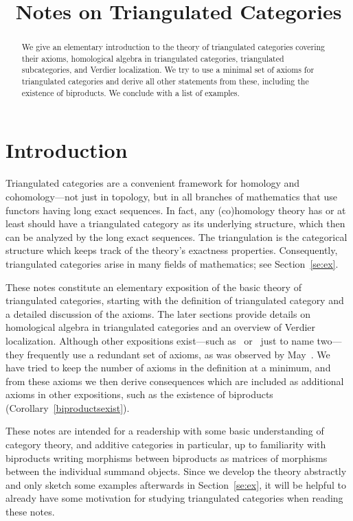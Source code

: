\documentclass{amsproc}
\title{Notes on Triangulated Categories}
\theoremstyle{definition}
\begin{document}
\maketitle
\begin{abstract}
We give an elementary introduction to the theory of triangulated categories covering their axioms, homological algebra in triangulated categories, triangulated subcategories, and Verdier localization. We try to use a minimal set of axioms for triangulated categories and derive all other statements from these, including the existence of biproducts. We conclude with a list of examples.
\end{abstract}
\tableofcontents

\section{Introduction}
\label{examples}

Triangulated categories are a convenient framework for homology and cohomology---not just in topology, but in all branches of mathematics that use functors having long exact sequences. In fact, any (co)homology theory has or at least should have a triangulated category as its underlying structure, which then can be analyzed by the long exact sequences. The triangulation is the categorical structure which keeps track of the theory's exactness properties. Consequently, triangulated categories arise in many fields of mathematics; see Section~\ref{se:ex}.

These notes constitute an elementary exposition of the basic theory of triangulated categories, starting with the definition of triangulated category and a detailed discussion of the axioms. The later sections provide details on homological algebra in triangulated categories and an overview of Verdier localization. Although other expositions exist---such as~\cite{Nee} or~\cite[Ch.~IV]{GM} just to name two---they frequently use a redundant set of axioms, as was observed by May~\cite{May,MayAdd}. We have tried to keep the number of axioms in the definition at a minimum, and from these axioms we then derive consequences which are included as additional axioms in other expositions, such as the existence of biproducts (Corollary~\ref{biproductsexist}).

These notes are intended for a readership with some basic understanding of category theory, and additive categories in particular, up to familiarity with biproducts writing morphisms between biproducts as matrices of morphisms between the individual summand objects. Since we develop the theory abstractly and only sketch some examples afterwards in Section~\ref{se:ex}, it will be helpful to already have some motivation for studying triangulated categories when reading these notes.
\end{document}
